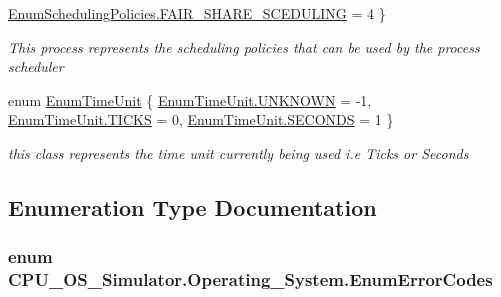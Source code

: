 \begin{DoxyCompactItemize}
\hyperlink{namespace_c_p_u___o_s___simulator_1_1_operating___system_ad0cdaacf9652394d23fa29109640fe08abce82cf69e3b635b2e6aaacec9cb17dd}{Enum\+Scheduling\+Policies.\+F\+A\+I\+R\+\_\+\+S\+H\+A\+R\+E\+\_\+\+S\+C\+E\+D\+U\+L\+I\+N\+G} = 4
 \}\begin{DoxyCompactList}\small\item\em This process represents the scheduling policies that can be used by the process scheduler \end{DoxyCompactList}
\item 
enum \hyperlink{namespace_c_p_u___o_s___simulator_1_1_operating___system_a0553d0bc2513aec52caa769acf994d5c}{Enum\+Time\+Unit} \{ \hyperlink{namespace_c_p_u___o_s___simulator_1_1_operating___system_a0553d0bc2513aec52caa769acf994d5ca696b031073e74bf2cb98e5ef201d4aa3}{Enum\+Time\+Unit.\+U\+N\+K\+N\+O\+W\+N} = -\/1, 
\hyperlink{namespace_c_p_u___o_s___simulator_1_1_operating___system_a0553d0bc2513aec52caa769acf994d5caecf45696420c3fbb68822dafc3378261}{Enum\+Time\+Unit.\+T\+I\+C\+K\+S} = 0, 
\hyperlink{namespace_c_p_u___o_s___simulator_1_1_operating___system_a0553d0bc2513aec52caa769acf994d5caa9126caa6ef3db9cf3c35ac627ad22b5}{Enum\+Time\+Unit.\+S\+E\+C\+O\+N\+D\+S} = 1
 \}\begin{DoxyCompactList}\small\item\em this class represents the time unit currently being used i.\+e Ticks or Seconds \end{DoxyCompactList}
\end{DoxyCompactItemize}


\subsection{Enumeration Type Documentation}
\hypertarget{namespace_c_p_u___o_s___simulator_1_1_operating___system_aea0b669d1bbf5690ae34ac2f8bef9470}{}
\subsubsection[{Enum\+Error\+Codes}]{\setlength{\rightskip}{0pt plus 5cm}enum {\bf C\+P\+U\+\_\+\+O\+S\+\_\+\+Simulator.\+Operating\+\_\+\+System.\+Enum\+Error\+Codes}\hspace{0.3cm}{\ttfamily [strong]}}\label{namespace_c_p_u___o_s___simulator_1_1_operating___system_aea0b669d1bbf5690ae34ac2f8bef9470}


